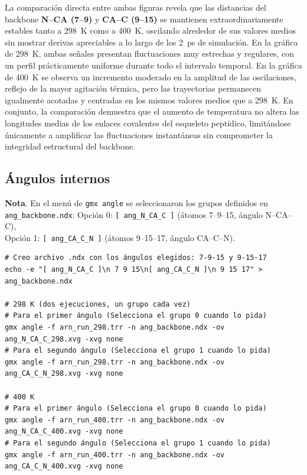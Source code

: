 \documentclass[12pt,a4paper]{article}
\begin{document}
La comparación directa entre ambas figuras revela que las distancias del backbone
\textbf{N--CA (7--9)} y \textbf{CA--C (9--15)} se mantienen extraordinariamente estables 
tanto a \SI{298}{K} como a \SI{400}{K}, oscilando alrededor de sus valores medios sin 
mostrar derivas apreciables a lo largo de los \SI{2}{ps} de simulación. En la gráfica de 
\SI{298}{K}, ambas señales presentan fluctuaciones muy estrechas y regulares, con un 
perfil prácticamente uniforme durante todo el intervalo temporal. En la gráfica de 
\SI{400}{K} se observa un incremento moderado en la amplitud de las oscilaciones, 
reflejo de la mayor agitación térmica, pero las trayectorias permanecen igualmente 
acotadas y centradas en los mismos valores medios que a \SI{298}{K}. En conjunto, la 
comparación demuestra que el aumento de temperatura no altera las longitudes 
medias de los enlaces covalentes del esqueleto peptídico, limitándose únicamente a 
amplificar las fluctuaciones instantáneas sin comprometer la integridad estructural 
del backbone.

\subsection{Ángulos internos}

\noindent\textbf{Nota}. En el menú de \texttt{gmx angle} se seleccionaron los grupos definidos en
\texttt{ang\_backbone.ndx}:
Opción 0: \texttt{[ ang\_N\_CA\_C ]} (átomos 7--9--15, ángulo N--CA--C),\\
Opción 1: \texttt{[ ang\_CA\_C\_N ]} (átomos 9--15--17, ángulo CA--C--N).

\begin{lstlisting}[style=bashstyle]
# Creo archivo .ndx con los ángulos elegidos: 7-9-15 y 9-15-17
echo -e "[ ang_N_CA_C ]\n 7 9 15\n[ ang_CA_C_N ]\n 9 15 17" > ang_backbone.ndx

# 298 K (dos ejecuciones, un grupo cada vez)
# Para el primer ángulo (Selecciona el grupo 0 cuando lo pida)
gmx angle -f arn_run_298.trr -n ang_backbone.ndx -ov ang_N_CA_C_298.xvg -xvg none
# Para el segundo ángulo (Selecciona el grupo 1 cuando lo pida)
gmx angle -f arn_run_298.trr -n ang_backbone.ndx -ov ang_CA_C_N_298.xvg -xvg none

# 400 K
# Para el primer ángulo (Selecciona el grupo 0 cuando lo pida)
gmx angle -f arn_run_400.trr -n ang_backbone.ndx -ov ang_N_CA_C_400.xvg -xvg none
# Para el segundo ángulo (Selecciona el grupo 1 cuando lo pida)
gmx angle -f arn_run_400.trr -n ang_backbone.ndx -ov ang_CA_C_N_400.xvg -xvg none
\end{lstlisting}
\end{document}
